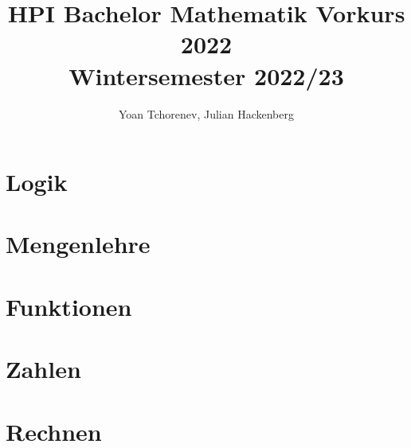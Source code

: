 \documentclass[12pt,a4paper]{article}
\title{%
    HPI Bachelor Mathematik Vorkurs 2022 \\
    \large Wintersemester 2022/23 \\
}
\author{Yoan Tchorenev, Julian Hackenberg}
\begin{document}
    \begin{titlepage}
        \maketitle
        \tableofcontents
    \end{titlepage}


    \section{Logik}\label{sec:logik}
    


    \section{Mengenlehre}\label{sec:mengenlehre}
    


    \section{Funktionen}\label{sec:funktionen}
    


    \section{Zahlen}\label{sec:zahlen}
    


    \section{Rechnen}\label{sec:rechnen}
    
\end{document}
